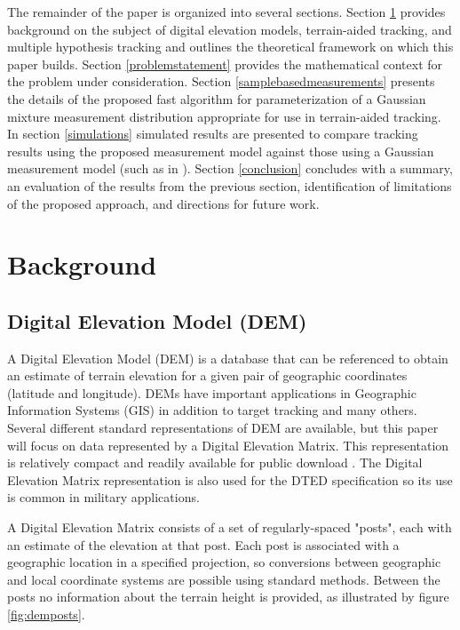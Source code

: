 \documentclass[journal]{IEEEtran}
\begin{document}
The remainder of the paper is organized into several sections. Section \ref{background} provides background on the subject of digital elevation models, terrain-aided tracking, and multiple hypothesis tracking and outlines the theoretical framework on which this paper builds. Section \ref{problemstatement} provides the mathematical context for the problem under consideration. Section \ref{samplebasedmeasurements} presents the details of the proposed fast algorithm for parameterization of a Gaussian mixture measurement distribution appropriate for use in terrain-aided tracking. In section \ref{simulations} simulated results are presented to compare tracking results using the proposed measurement model against those using a Gaussian measurement model (such as in \cite{kim2009terrain}). Section \ref{conclusion} concludes with a summary, an evaluation of the results from the previous section, identification of limitations of the proposed approach, and directions for future work.








\section{Background} \label{background}

\subsection{Digital Elevation Model (DEM)} \label{digitalterrainmaps}
A Digital Elevation Model (DEM) is a database that can be referenced to obtain an estimate of terrain elevation for a given pair of geographic coordinates (latitude and longitude). DEMs have important applications in Geographic Information Systems (GIS) \cite{qgis} in addition to target tracking and many others. Several different standard representations of DEM are available, but this paper will focus on data represented by a Digital Elevation Matrix. This representation is relatively compact and readily available for public download \cite{jpl13, robinson2012high}. The Digital Elevation Matrix representation is also used for the DTED specification \cite{MILPRF89020B} so its use is common in military applications.

A Digital Elevation Matrix consists of a set of regularly-spaced "posts", each with an estimate of the elevation at that post. Each post is associated with a geographic location in a specified projection, so conversions between geographic and local coordinate systems are possible using standard methods. Between the posts no information about the terrain height is provided, as illustrated by figure \ref{fig:demposts}.
\end{document}
